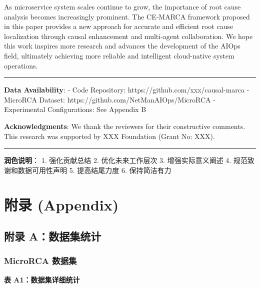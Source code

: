 As microservice system scales continue to grow, the importance of root
cause analysis becomes increasingly prominent. The CE-MARCA framework
proposed in this paper provides a new approach for accurate and
efficient root cause localization through causal enhancement and
multi-agent collaboration. We hope this work inspires more research and
advances the development of the AIOps field, ultimately achieving more
reliable and intelligent cloud-native system operations.

\begin{center}\rule{0.5\linewidth}{0.5pt}\end{center}

\textbf{Data Availability}: - Code Repository:
https://github.com/xxx/causal-marca - MicroRCA Dataset:
https://github.com/NetManAIOps/MicroRCA - Experimental Configurations:
See Appendix B

\textbf{Acknowledgments}: We thank the reviewers for their constructive
comments. This research was supported by XXX Foundation (Grant No: XXX).

\begin{center}\rule{0.5\linewidth}{0.5pt}\end{center}

\textbf{润色说明}： 1. 强化贡献总结 2. 优化未来工作层次 3.
增强实际意义阐述 4. 规范致谢和数据可用性声明 5. 提高结尾力度 6.
保持简洁有力

\hypertarget{ux9644ux5f55-appendix}{%
\section{附录 (Appendix)}\label{ux9644ux5f55-appendix}}

\hypertarget{ux9644ux5f55-aux6570ux636eux96c6ux7edfux8ba1}{%
\subsection{附录
A：数据集统计}\label{ux9644ux5f55-aux6570ux636eux96c6ux7edfux8ba1}}

\hypertarget{microrca-ux6570ux636eux96c6}{%
\subsubsection{MicroRCA 数据集}\label{microrca-ux6570ux636eux96c6}}

\textbf{表 A1：数据集详细统计}

